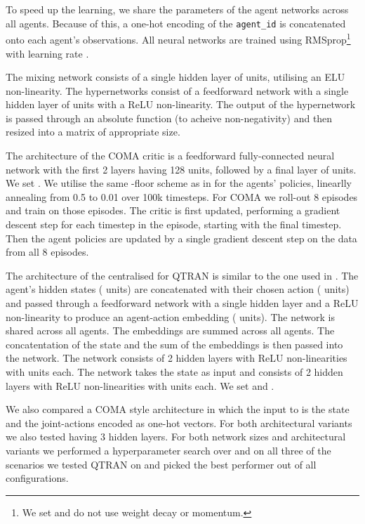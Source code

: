 \documentclass[twoside,11pt]{article}
\begin{document}
To speed up the learning, we share the parameters of the agent networks across all agents. 
Because of this, a one-hot encoding of the \texttt{agent\_id} is concatenated onto each agent's observations. 
All neural networks are trained using RMSprop\footnote{We set  and do not use weight decay or momentum.} with learning rate . 

The mixing network consists of a single hidden layer of  units, utilising an ELU non-linearity. 
The hypernetworks consist of a feedforward network with a single hidden layer of  units with a ReLU non-linearity. 
The output of the hypernetwork is passed through an absolute function (to acheive non-negativity) and then resized into a matrix of appropriate size.

The architecture of the COMA critic is a feedforward fully-connected neural network with the first 2 layers having 128 units, followed by a final layer of  units. We set . 
We utilise the same -floor scheme as in \citep{foerster_counterfactual_2017} for the agents’ policies, linearlly annealing  from 0.5 to 0.01 over 100k timesteps.
For COMA we roll-out 8 episodes and train on those episodes.
The critic is first updated, performing a gradient descent step for each timestep in the episode, starting with the final timestep.
Then the agent policies are updated by a single gradient descent step on the data from all 8 episodes.

The architecture of the centralised  for QTRAN is similar to the one used in \citep{son_qtran:_2019}.
The agent's hidden states ( units) are concatenated with their chosen action ( units) and passed through a feedforward network with a single hidden layer and a ReLU non-linearity to produce an agent-action embedding ( units). The network is shared across all agents. The embeddings are summed across all agents.
The concatentation of the state and the sum of the embeddings is then passed into the  network.
The  network consists of 2 hidden layers with ReLU non-linearities with  units each.
The  network takes the state as input and consists of 2 hidden layers with ReLU non-linearities with  units each.
We set  and .

We also compared a COMA style architecture in which the input to  is the state and the joint-actions encoded as one-hot vectors.
For both architectural variants we also tested having 3 hidden layers.
For both network sizes and architectural variants we performed a hyperparameter search over  and  on all three of the scenarios we tested QTRAN on and picked the best performer out of all configurations.
\end{document}
